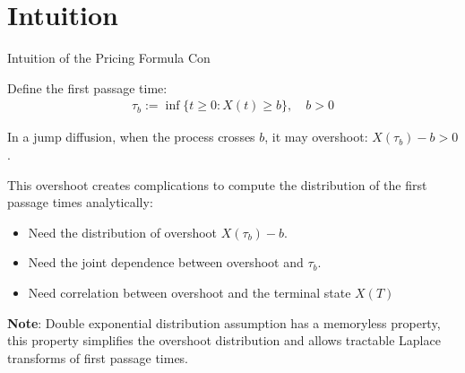 \documentclass{beamer}
\begin{document}
\section{Intuition}
\begin{frame}{Intuition of the Pricing Formula Con}


     {\footnotesize \footnotesize
    \par Define the first passage time:
    \begin{align*}
        \tau_{b} := \inf\{t \geq 0 : X(t) \geq b\}, \quad b > 0
    \end{align*}
    \par In a jump diffusion, when the process crosses \( b \), it may overshoot: $X(\tau_{b}) - b > 0$.
    \vspace{1em}
    \par This overshoot creates complications to compute the distribution of the first passage
times analytically: 
    \begin{itemize}
        \item Need the distribution of overshoot \( X(\tau_{b}) - b \).
        \item Need the joint dependence between overshoot and \( \tau_{b} \).
        \item Need correlation between overshoot and the terminal state \( X(T) \)
    \end{itemize}
    \vspace{1em}
    \par \textbf{Note}: Double exponential distribution assumption has a memoryless property, this property 
    simplifies the overshoot distribution and allows tractable Laplace transforms of first passage times.
    }
    
\end{frame}
\end{document}
